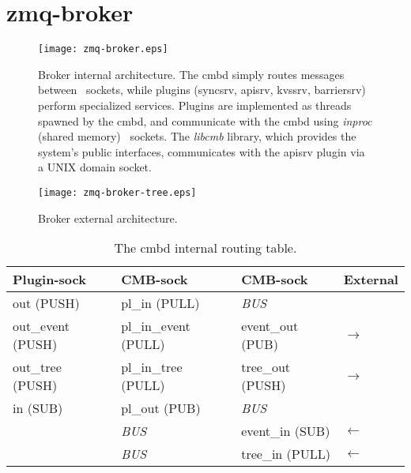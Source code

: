 \section{zmq-broker}

\begin{figure}
\centering
\texttt{[image: zmq-broker.eps]}
\caption{Broker internal architecture.  The cmbd simply routes messages
between \zMQ\ sockets, while plugins (syncsrv, apisrv, kvssrv, barriersrv)
perform specialized services.
Plugins are implemented as threads spawned by the cmbd, and communicate
with the cmbd using {\em inproc} (shared memory) \zMQ\ sockets.
The {\em libcmb} library, which provides the system's public interfaces,
communicates with the apisrv plugin via a UNIX domain socket.}
\label{fig:cmbint}
\end{figure}

\begin{figure}
\centering
\texttt{[image: zmq-broker-tree.eps]}
\caption{Broker external architecture.}
\label{fig:cmbext}
\end{figure}

\begin{table}
\centering
\begin{tabular}{|l|l|l|l|}\hline
\textbf{Plugin-sock} & \textbf{CMB-sock} & \textbf{CMB-sock}
					 & \textbf{External} \\
\hline
out (PUSH)		& pl\_in (PULL)	& {\em BUS} & \\
out\_event (PUSH)  & pl\_in\_event (PULL) & event\_out (PUB) & $\rightarrow$ \\
out\_tree (PUSH) & pl\_in\_tree	(PULL) & tree\_out (PUSH) & $\rightarrow$ \\
in (SUB)	& pl\_out (PUB)	& {\em BUS}     & \\
\hline
		& {\em BUS}	& event\_in (SUB) & $\leftarrow$ \\
		& {\em BUS}	& tree\_in (PULL) & $\leftarrow$ \\
\hline
\end{tabular}
\caption{The cmbd internal routing table.}
\label{fig:cmbrouting}
\end{table}


